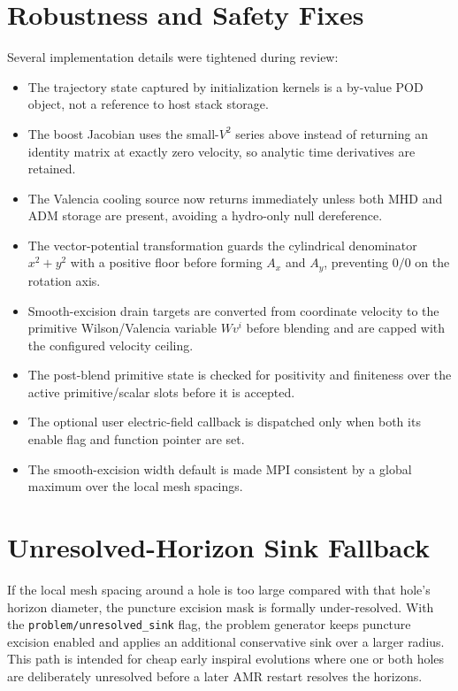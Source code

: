 \documentclass[11pt]{article}
\begin{document}
\section{Robustness and Safety Fixes}

Several implementation details were tightened during review:
\begin{itemize}
  \item The trajectory state captured by initialization kernels is a
  by-value POD object, not a reference to host stack storage.
  \item The boost Jacobian uses the small-\(V^2\) series above instead of
  returning an identity matrix at exactly zero velocity, so analytic time
  derivatives are retained.
  \item The Valencia cooling source now returns immediately unless both MHD
  and ADM storage are present, avoiding a hydro-only null dereference.
  \item The vector-potential transformation guards the cylindrical
  denominator \(x^2+y^2\) with a positive floor before forming
  \(A_x\) and \(A_y\), preventing \(0/0\) on the rotation axis.
  \item Smooth-excision drain targets are converted from coordinate velocity
  to the primitive Wilson/Valencia variable \(Wv^i\) before blending and are
  capped with the configured velocity ceiling.
  \item The post-blend primitive state is checked for positivity and
  finiteness over the active primitive/scalar slots before it is accepted.
  \item The optional user electric-field callback is dispatched only when
  both its enable flag and function pointer are set.
  \item The smooth-excision width default is made MPI consistent by a global
  maximum over the local mesh spacings.
\end{itemize}

\section{Unresolved-Horizon Sink Fallback}

If the local mesh spacing around a hole is too large compared with that
hole's horizon diameter, the puncture excision mask is formally
under-resolved.  With the \texttt{problem/unresolved\_sink} flag, the problem
generator keeps puncture excision enabled and applies an additional
conservative sink over a larger radius.  This path is intended for cheap
early inspiral evolutions where one or both holes are deliberately unresolved
before a later AMR restart resolves the horizons.
\end{document}
